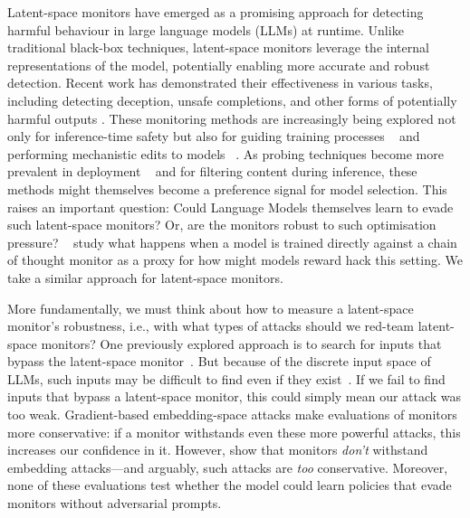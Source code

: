 Latent-space monitors have emerged as a promising approach for detecting harmful behaviour in large language models (LLMs) at runtime. Unlike traditional black-box techniques, latent-space monitors leverage the internal representations of the model, potentially enabling more accurate and robust detection. Recent work has demonstrated their effectiveness in various tasks, including detecting deception, unsafe completions, and other forms of potentially harmful outputs \citep{goldowsky2025detecting,mallen2023eliciting, macdiarmid2024sleeperagentprobes,bricken2024using}. These monitoring methods are increasingly being explored not only for inference-time safety but also for guiding training processes ~\citep{papadatos2024linear,zou2024improving} and performing mechanistic edits to models ~\citep{arditi2024refusal,nguyen2025probing}. As probing techniques become more prevalent in deployment ~\citep{anthropicCostEffectiveConstitutional,nguyen2025sae_rakuten} and for filtering content during inference, these methods might themselves become a preference signal for model selection. 
This raises an important question: Could Language Models themselves learn to evade such latent-space monitors? Or, are the monitors robust to such optimisation pressure? ~\citet{baker2025monitoring} study what happens when a model is trained directly against a chain of thought monitor as a proxy for how might models reward hack this setting. We take a similar approach for latent-space monitors.

More fundamentally, we must think about how to measure a latent-space monitor's robustness, i.e., with what types of attacks should we red-team latent-space monitors? 
One previously explored approach is to search for inputs that bypass the latent-space monitor~\citep{zou2023universal,liu2023autodan}. But because of the discrete input space of LLMs, such inputs may be difficult to find even if they exist~\citep{bailey2024obfuscated,sharma2025constitutional}. 
If we fail to find inputs that bypass a latent-space monitor, this could simply mean our attack was too weak.
Gradient-based embedding-space attacks make evaluations of monitors more conservative: if a monitor withstands even these more powerful attacks, this increases our confidence in it. However, \citet{bailey2024obfuscated} show that monitors \emph{don't} withstand embedding attacks---and arguably, such attacks are \emph{too} conservative. Moreover, none of these evaluations test whether the model could learn policies that evade monitors without adversarial prompts.

